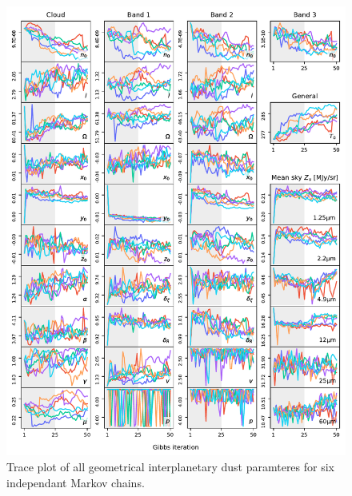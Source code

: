 \documentclass[twocolumn]{aa}
\begin{document}
\begin{figure}
    \centering
    \includegraphics[width=1\textwidth]{figs/total_trace.pdf}
    \caption{Trace plot of all geometrical interplanetary dust paramteres for six independant Markov chains.}
    \label{fig:trace-ipd}
\end{figure}
\end{document}
